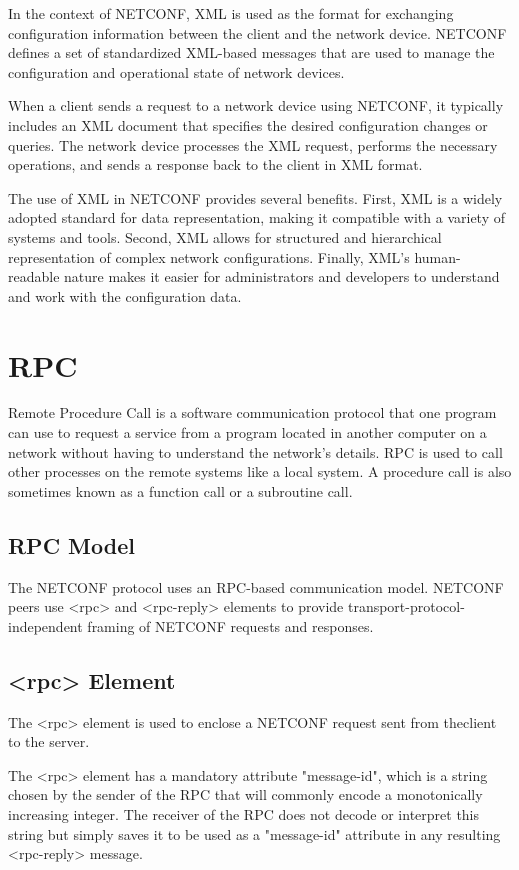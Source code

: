 In the context of NETCONF, XML is used as the format for exchanging configuration information between the client and the network device. NETCONF defines a set of standardized XML-based messages that are used to manage the configuration and operational state of network devices.

When a client sends a request to a network device using NETCONF, it typically includes an XML document that specifies the desired configuration changes or queries. The network device processes the XML request, performs the necessary operations, and sends a response back to the client in XML format.

The use of XML in NETCONF provides several benefits. First, XML is a widely adopted standard for data representation, making it compatible with a variety of systems and tools. Second, XML allows for structured and hierarchical representation of complex network configurations. Finally, XML's human-readable nature makes it easier for administrators and developers to understand and work with the configuration data.


\section{RPC}
Remote Procedure Call is a software communication protocol that one program can use to request a service from a program located in another computer on a network without having to understand the network's details. RPC is used to call other processes on the remote systems like a local system. A procedure call is also sometimes known as a function call or a subroutine call.
\subsection*{RPC Model}
The NETCONF protocol uses an RPC-based communication model.  NETCONF peers use \textless{rpc}\textgreater{} and \textless{rpc-reply}\textgreater{} elements to provide transport-protocol-independent framing of NETCONF requests and responses.

\subsection*{\textless{rpc}\textgreater{} Element}
The \textless{rpc}\textgreater{} element is used to enclose a NETCONF request sent from theclient to the server.

The \textless{rpc}\textgreater{} element has a mandatory attribute "message-id", which is a
   string chosen by the sender of the RPC that will commonly encode a
   monotonically increasing integer.  The receiver of the RPC does not
   decode or interpret this string but simply saves it to be used as a
   "message-id" attribute in any resulting \textless{rpc-reply}\textgreater{} message. 


